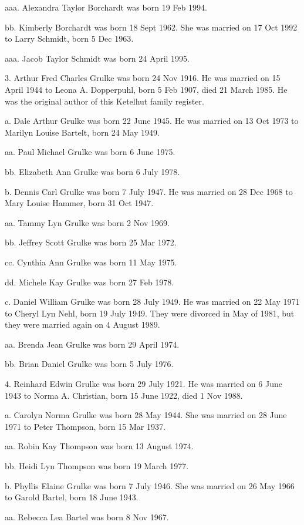 \documentclass[a4paper]{article}
\begin{document}
aaa. Alexandra Taylor Borchardt was born 19 Feb 1994.

bb. Kimberly Borchardt was born 18 Sept 1962.  She was married on 17 Oct 1992 to Larry Schmidt, born 5 Dec 1963.

aaa. Jacob Taylor Schmidt was born 24 April 1995.

3.  Arthur Fred Charles Grulke was born 24 Nov 1916.  He was married on 15 April 1944 to Leona A. Dopperpuhl, born 5 Feb 1907, died 21 March 1985.  He was the original author of this Ketelhut family register.

a. Dale Arthur Grulke was born 22 June 1945.  He was married on 13 Oct 1973 to Marilyn Louise Bartelt, born 24 May 1949.

aa. Paul Michael Grulke was born 6 June 1975.

bb. Elizabeth Ann Grulke was born 6 July 1978.

b. Dennis Carl Grulke was born 7 July 1947.   He was married on 28 Dec 1968 to Mary Louise Hammer, born 31 Oct 1947.

aa. Tammy Lyn Grulke was born 2 Nov 1969.

bb. Jeffrey Scott Grulke was born 25 Mar 1972.

cc. Cynthia Ann Grulke was born 11 May 1975.

dd. Michele Kay Grulke was born 27 Feb 1978.

c. Daniel William Grulke was born 28 July 1949.  He was married on 22 May 1971 to Cheryl Lyn Nehl, born 19 July 1949.  They were divorced in May of 1981, but they were married again on 4 August 1989.  

aa. Brenda Jean Grulke was born 29 April 1974.

bb. Brian Daniel Grulke was born 5 July 1976.

4. Reinhard Edwin Grulke was born 29 July 1921.  He was married on 6 June 1943 to Norma A. Christian, born 15 June 1922, died 1 Nov 1988.

a. Carolyn Norma Grulke was born 28 May 1944.  She was married on 28 June 1971 to Peter Thompson, born 15 Mar 1937.

aa. Robin Kay Thompson was born 13 August 1974.

bb. Heidi Lyn Thompson was born 19 March 1977.

b. Phyllis Elaine Grulke was born 7 July 1946.  She was married on 26 May 1966 to Garold Bartel, born 18 June 1943.

aa. Rebecca Lea Bartel was born 8 Nov 1967.
\end{document}
